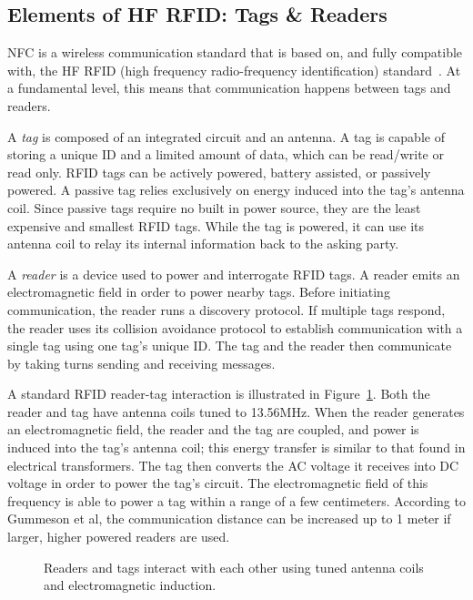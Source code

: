\documentclass{sig-alternate}
\begin{document}
\subsection{Elements of HF RFID: Tags \& Readers}
\label{sec:activePassive}

NFC is a wireless communication standard that is based on, and fully compatible with, the HF RFID (high frequency radio-frequency identification) standard~\cite{Gum2013}. At a fundamental level, this means that communication happens between tags and readers.

A \textit{tag} is composed of an integrated circuit and an antenna. A tag is capable of storing a unique ID and a limited amount of data, which can be read/write or read only. RFID tags can be actively powered, battery assisted, or passively powered. A passive tag relies exclusively on energy induced into the tag's antenna coil. Since passive tags require no built in power source, they are the least expensive and smallest RFID tags. While the tag is powered, it can use its antenna coil to relay its internal information back to the asking party.~\cite{wiki:RFID}

A \textit{reader} is a device used to power and interrogate RFID tags. A reader emits an electromagnetic field in order to power nearby tags. Before initiating communication, the reader runs a discovery protocol. If multiple tags respond, the reader uses its collision avoidance protocol to establish communication with a single tag using one tag's unique ID. The tag and the reader then communicate by taking turns sending and receiving messages.~\cite{Gum2013}

A standard RFID reader-tag interaction is illustrated in Figure~\ref{fig:rfid}. Both the reader and tag have antenna coils tuned to 13.56MHz. When the reader generates an electromagnetic field, the reader and the tag are coupled, and power is induced into the tag's antenna coil; this energy transfer is similar to that found in electrical transformers. The tag then converts the AC voltage it receives into DC voltage in order to power the tag's circuit. The electromagnetic field of this frequency is able to power a tag within a range of a few centimeters. According to Gummeson et al, the communication distance can be increased up to 1 meter if larger, higher powered readers are used.~\cite{Gum2013}


\begin{figure}
\centering
{}
\caption{Readers and tags interact with each other using tuned antenna coils and electromagnetic induction.}
\label{fig:rfid}
\end{figure}
\end{document}
